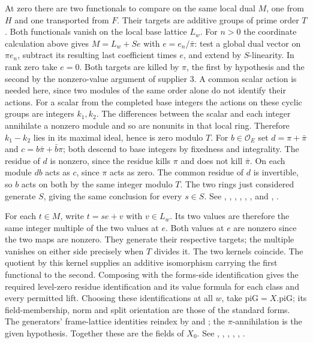 At zero there are two functionals to compare on the same local dual
$M$, one from $H$ and one transported from $F$. Their targets are
additive groups of prime order $T$. Both functionals vanish on the
local base lattice $L_w$. For $n>0$ the coordinate calculation above
gives $M=L_w+S e$ with $e=e_n/\bar\pi$: test a global dual
vector on $\pi e_n$, subtract its resulting last coefficient times
$e$, and extend by $S$-linearity. In rank zero take $e=0$.
Both targets are killed by $\pi$, the first by hypothesis and the
second by the nonzero-value argument of supplier 3. A common scalar
action is needed here, since two modules of the same order alone do
not identify their actions. For a scalar from the completed base
integers the actions on these cyclic groups are integers $k_1,k_2$.
The differences between the scalar and each integer annihilate a
nonzero module and so are nonunits in that local ring. Therefore
$k_1-k_2$ lies in its maximal ideal, hence is zero modulo $T$.
For $b\in\mathcal O_E$ set
$d=\pi+\bar\pi$ and $c=b\bar\pi+\bar b\pi$; both descend to
base integers by fixedness and integrality. The residue of $d$ is
nonzero, since the residue kills $\pi$ and does not kill $\bar\pi$.
On each module $db$ acts as $c$, since $\pi$ acts as zero. The
common residue of $d$ is invertible, so $b$ acts on both by the
same integer modulo $T$. The two rings just considered generate $S$,
giving the same conclusion for every $s\in S$.
See , ,
, ,
, ,
and ,
.

For each $t\in M$, write $t=se+v$ with $v\in L_w$.
Its two values are therefore the same integer multiple of the two
values at $e$. Both values at $e$ are nonzero since the two maps are
nonzero. They generate their respective targets; the multiple vanishes
on either side precisely when $T$ divides it. The two kernels coincide.
The quotient by this kernel supplies an additive isomorphism carrying
the first functional to the second. Composing with the forms-side
identification gives the required level-zero residue identification
and its value formula for each class and every permitted lift. Choosing
these identifications at all $w$, take $\mathrm{piG}=X.\mathrm{piG}$;
its field-membership, norm and split orientation are those of
the standard forms. The generators' frame-lattice identities reindex
by  and ; the $\pi$-annihilation is the
given hypothesis. Together these are the fields of $X_0$.
See , ,
,
,
,
.

